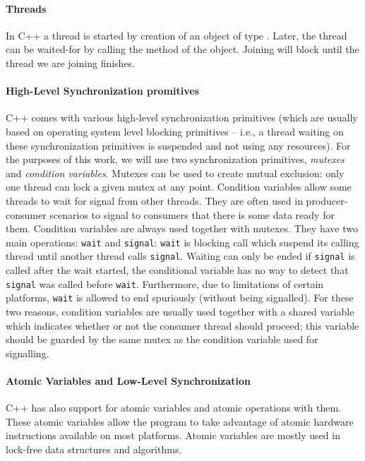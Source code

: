 \paragraph{Threads}
%
In C++ a thread is started by creation of an object of type .
Later, the thread can be waited-for by calling the  method of the
 object.
Joining will block until the thread we are joining finishes.

\paragraph{High-Level Synchronization promitives}

C++ comes with various high-level synchronization primitives (which are usually
based on operating system level blocking primitives -- i.e., a thread waiting
on these synchronization primitives is suspended and not using any resources).
%
For the purposes of this work, we will use two synchronization primitives,
\emph{mutexes} and \emph{condition variables}.
Mutexes can be used to create mutual exclusion: only one thread can lock a
given mutex at any point.
Condition variables allow some threads to wait for signal from other threads.
They are often used in producer-consumer scenarios to signal to consumers that
there is some data ready for them.
Condition variables are always used together with mutexes.
They have two main operations: \texttt{wait} and \texttt{signal}: \texttt{wait}
is blocking call which suspend its calling thread until another thread calls
\texttt{signal}.
Waiting can only be ended if \texttt{signal} is called after the wait started,
the conditional variable has no way to detect that \texttt{signal} was called
before \texttt{wait}.
Furthermore, due to limitations of certain platforms, \texttt{wait} is allowed
to end spuriously (without being signalled).
For these two reasons, condition variables are usually used together with a
shared variable which indicates whether or not the consumer thread should
proceed; this variable should be guarded by the same mutex as the condition
variable used for signalling.

\paragraph{Atomic Variables and Low-Level Synchronization}
%
C++ has also support for atomic variables and atomic operations with them.
These atomic variables allow the program to take advantage of atomic hardware
instructions available on most platforms.
Atomic variables are mostly used in lock-free data structures and algorithms.


